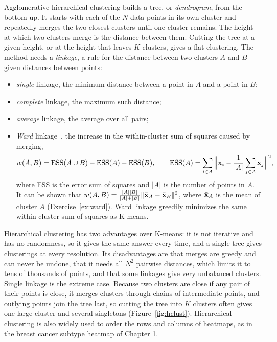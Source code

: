 Agglomerative hierarchical clustering builds a tree, or \emph{dendrogram}, from the bottom up. It starts with each of the $N$ data points in its own cluster and repeatedly merges the two closest clusters until one cluster remains. The height at which two clusters merge is the distance between them. Cutting the tree at a given height, or at the height that leaves $K$ clusters, gives a flat clustering. The method needs a \emph{linkage}, a rule for the distance between two clusters $A$ and $B$ given distances between points:
\begin{itemize}
  \item \emph{single} linkage, the minimum distance between a point in $A$ and a point in $B$;
  \item \emph{complete} linkage, the maximum such distance;
  \item \emph{average} linkage, the average over all pairs;
  \item \emph{Ward} linkage~\citep{ward1963}, the increase in the within-cluster sum of squares caused by merging,
  \begin{equation}
    w(A,B) = \text{ESS}(A\cup B) - \text{ESS}(A) - \text{ESS}(B), \qquad
    \text{ESS}(A) = \sum_{i\in A}\Big\|\mathbf{x}_i-\frac{1}{|A|}\sum_{j\in A}\mathbf{x}_j\Big\|^2 ,
    \label{eq:ward}
  \end{equation}
  where ESS is the error sum of squares and $|A|$ is the number of points in $A$. It can be shown that $w(A,B)=\frac{|A||B|}{|A|+|B|}\|\bar{\mathbf{x}}_A-\bar{\mathbf{x}}_B\|^2$, where $\bar{\mathbf{x}}_A$ is the mean of cluster $A$ (Exercise~\ref{ex:ward}). Ward linkage greedily minimizes the same within-cluster sum of squares as K-means.
\end{itemize}

Hierarchical clustering has two advantages over K-means: it is not iterative and has no randomness, so it gives the same answer every time, and a single tree gives clusterings at every resolution. Its disadvantages are that merges are greedy and can never be undone, that it needs all $N^2$ pairwise distances, which limits it to tens of thousands of points, and that some linkages give very unbalanced clusters. Single linkage is the extreme case. Because two clusters are close if any pair of their points is close, it merges clusters through chains of intermediate points, and outlying points join the tree last, so cutting the tree into $K$ clusters often gives one large cluster and several singletons (Figure~\ref{fig:hclust}). Hierarchical clustering is also widely used to order the rows and columns of heatmaps, as in the breast cancer subtype heatmap of Chapter 1.


